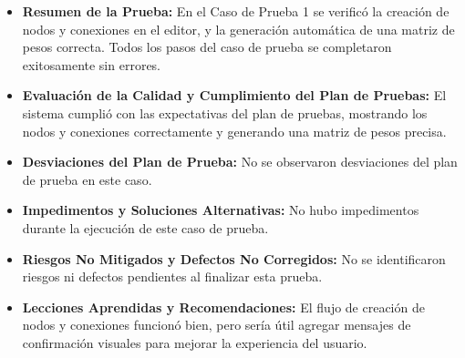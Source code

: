 \documentclass[stu, 12pt, letterpaper, donotrepeattitle, floatsintext, natbib]{apa7}
\begin{document}
\begin{itemize}
    \item \textbf{Resumen de la Prueba:} En el Caso de Prueba 1 se verificó la creación de nodos y conexiones en el editor, y la generación automática de una matriz de pesos correcta. Todos los pasos del caso de prueba se completaron exitosamente sin errores.
    
    \item \textbf{Evaluación de la Calidad y Cumplimiento del Plan de Pruebas:} El sistema cumplió con las expectativas del plan de pruebas, mostrando los nodos y conexiones correctamente y generando una matriz de pesos precisa.
    
    \item \textbf{Desviaciones del Plan de Prueba:} No se observaron desviaciones del plan de prueba en este caso.
    
    \item \textbf{Impedimentos y Soluciones Alternativas:} No hubo impedimentos durante la ejecución de este caso de prueba.
    
    \item \textbf{Riesgos No Mitigados y Defectos No Corregidos:} No se identificaron riesgos ni defectos pendientes al finalizar esta prueba.
    
    \item \textbf{Lecciones Aprendidas y Recomendaciones:} El flujo de creación de nodos y conexiones funcionó bien, pero sería útil agregar mensajes de confirmación visuales para mejorar la experiencia del usuario.
\end{itemize}
\end{document}
